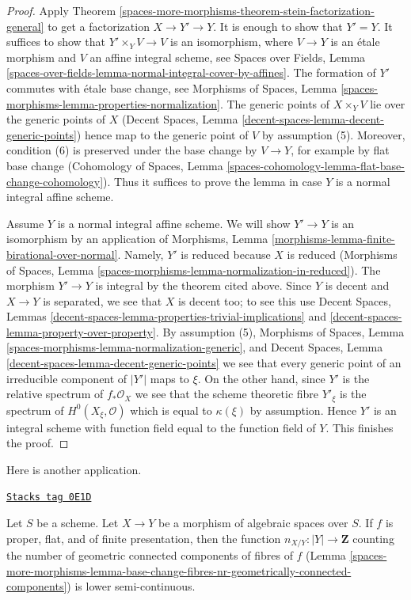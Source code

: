 \begin{proof}
Apply Theorem \ref{spaces-more-morphisms-theorem-stein-factorization-general} to get a
factorization $X \to Y' \to Y$. It is enough to show that $Y' = Y$.
It suffices to show that $Y' \times_Y V \to V$ is an isomorphism,
where $V \to Y$ is an \'etale morphism and $V$ an affine integral scheme,
see Spaces over Fields, Lemma
\ref{spaces-over-fields-lemma-normal-integral-cover-by-affines}.
The formation of $Y'$ commutes with \'etale base change, see
Morphisms of Spaces, Lemma
\ref{spaces-morphisms-lemma-properties-normalization}.
The generic points of $X \times_Y V$ lie over the generic points of $X$
(Decent Spaces, Lemma \ref{decent-spaces-lemma-decent-generic-points})
hence map to the generic point of $V$ by assumption (5). Moreover, condition
(6) is preserved under the base change by $V \to Y$, for example by
flat base change (Cohomology of Spaces, Lemma
\ref{spaces-cohomology-lemma-flat-base-change-cohomology}).
Thus it suffices to prove the lemma in case $Y$ is a normal
integral affine scheme.

\medskip\noindent
Assume $Y$ is a normal integral affine scheme. We will show $Y' \to Y$
is an isomorphism by an application of Morphisms, Lemma
\ref{morphisms-lemma-finite-birational-over-normal}.
Namely, $Y'$ is reduced because $X$ is reduced (Morphisms of Spaces, Lemma
\ref{spaces-morphisms-lemma-normalization-in-reduced}).
The morphism $Y' \to Y$ is integral by the theorem cited above.
Since $Y$ is decent and $X \to Y$ is separated, we see that
$X$ is decent too; to see this use
Decent Spaces, Lemmas
\ref{decent-spaces-lemma-properties-trivial-implications} and
\ref{decent-spaces-lemma-property-over-property}. By assumption (5),
Morphisms of Spaces, Lemma \ref{spaces-morphisms-lemma-normalization-generic},
and Decent Spaces, Lemma \ref{decent-spaces-lemma-decent-generic-points}
we see that every generic point of an irreducible component of $|Y'|$
maps to $\xi$. On the other hand, since $Y'$ is the relative
spectrum of $f_*\mathcal{O}_X$ we see that the scheme theoretic fibre
$Y'_\xi$ is the spectrum of $H^0(X_\xi, \mathcal{O})$ which is
equal to $\kappa(\xi)$ by assumption. Hence $Y'$ is an integral
scheme with function field equal to the function field of $Y$.
This finishes the proof.
\end{proof}

Here is another application.

\begin{lemma}
\label{spaces-more-morphisms-lemma-proper-flat-nr-geom-conn-comps-lower-semicontinuous}
\href{https://stacks.math.columbia.edu/tag/0E1D}{\texttt{Stacks tag 0E1D}}

Let $S$ be a scheme.
Let $X \to Y$ be a morphism of algebraic spaces over $S$.
If $f$ is proper, flat, and of finite presentation, then the function
$n_{X/Y} : |Y| \to \mathbf{Z}$ counting the number of geometric
connected components of fibres of $f$
(Lemma \ref{spaces-more-morphisms-lemma-base-change-fibres-nr-geometrically-connected-components})
is lower semi-continuous.
\end{lemma}

